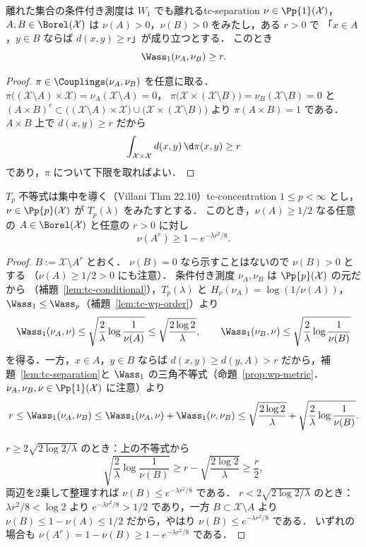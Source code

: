 \begin{lemma}{離れた集合の条件付き測度は $W_1$ でも離れる}{tc-separation}
  $\nu\in\Pp{1}(\mathcal{X})$，$A,B\in\Borel(\mathcal{X})$ は
  $\nu(A)>0$，$\nu(B)>0$ をみたし，ある $r>0$ で
  「$x\in A$，$y\in B$ ならば $d(x,y)\geq r$」が成り立つとする．
  このとき
  \[
    \Wass_1(\nu_A,\nu_B)\geq r.
  \]
\end{lemma}

\begin{proof}
  $\pi\in\Couplings(\nu_A,\nu_B)$ を任意に取る．
  $\pi\bigl((\mathcal{X}\setminus A)\times\mathcal{X}\bigr)
  =\nu_A(\mathcal{X}\setminus A)=0$，
  $\pi\bigl(\mathcal{X}\times(\mathcal{X}\setminus B)\bigr)
  =\nu_B(\mathcal{X}\setminus B)=0$ と
  $(A\times B)^c\subset
  \bigl((\mathcal{X}\setminus A)\times\mathcal{X}\bigr)
  \cup\bigl(\mathcal{X}\times(\mathcal{X}\setminus B)\bigr)$ より
  $\pi(A\times B)=1$ である．
  $A\times B$ 上で $d(x,y)\geq r$ だから
  \[
    \int_{\mathcal{X}\times\mathcal{X}}d(x,y)\,\d\pi(x,y)\geq r
  \]
  であり，$\pi$ について下限を取ればよい．
\end{proof}

\begin{theorem}{$T_p$ 不等式は集中を導く（Villani Thm 22.10）}{tc-concentration}
  $1\leq p<\infty$ とし，$\nu\in\Pp{p}(\mathcal{X})$ が
  $T_p(\lambda)$ をみたすとする．
  このとき，$\nu(A)\geq1/2$ なる任意の
  $A\in\Borel(\mathcal{X})$ と任意の $r>0$ に対し
  \[
    \nu(A^r)\geq1-e^{-\lambda r^2/8}.
  \]
\end{theorem}

\begin{proof}
  $B:=\mathcal{X}\setminus A^r$ とおく．
  $\nu(B)=0$ なら示すことはないので $\nu(B)>0$ とする
  （$\nu(A)\geq1/2>0$ にも注意）．
  条件付き測度 $\nu_A,\nu_B$ は $\Pp{p}(\mathcal{X})$ の元だから
  （補題~\ref{lem:tc-conditional}），$T_p(\lambda)$ と
  $H_\nu(\nu_A)=\log(1/\nu(A))$，
  $\Wass_1\leq\Wass_p$（補題~\ref{lem:tc-wp-order}）より
  \[
    \Wass_1(\nu_A,\nu)\leq\sqrt{\frac{2}{\lambda}\log\frac{1}{\nu(A)}}
    \leq\sqrt{\frac{2\log2}{\lambda}},
    \qquad
    \Wass_1(\nu_B,\nu)\leq\sqrt{\frac{2}{\lambda}\log\frac{1}{\nu(B)}}
  \]
  を得る．一方，$x\in A$，$y\in B$ ならば
  $d(x,y)\geq d(y,A)>r$ だから，補題~\ref{lem:tc-separation}と
  $\Wass_1$ の三角不等式（命題~\ref{prop:wp-metric}．
  $\nu_A,\nu_B,\nu\in\Pp{1}(\mathcal{X})$ に注意）より
  \[
    r\leq\Wass_1(\nu_A,\nu_B)
    \leq\Wass_1(\nu_A,\nu)+\Wass_1(\nu,\nu_B)
    \leq\sqrt{\frac{2\log2}{\lambda}}
    +\sqrt{\frac{2}{\lambda}\log\frac{1}{\nu(B)}}.
  \]

  $r\geq2\sqrt{2\log2/\lambda}$ のとき：上の不等式から
  \[
    \sqrt{\frac{2}{\lambda}\log\frac{1}{\nu(B)}}
    \geq r-\sqrt{\frac{2\log2}{\lambda}}
    \geq\frac{r}{2},
  \]
  両辺を2乗して整理すれば
  $\nu(B)\leq e^{-\lambda r^2/8}$ である．
  $r<2\sqrt{2\log2/\lambda}$ のとき：$\lambda r^2/8<\log2$ より
  $e^{-\lambda r^2/8}>1/2$ であり，一方
  $B\subset\mathcal{X}\setminus A$ より
  $\nu(B)\leq1-\nu(A)\leq1/2$ だから，やはり
  $\nu(B)\leq e^{-\lambda r^2/8}$ である．
  いずれの場合も
  $\nu(A^r)=1-\nu(B)\geq1-e^{-\lambda r^2/8}$ である．
\end{proof}


